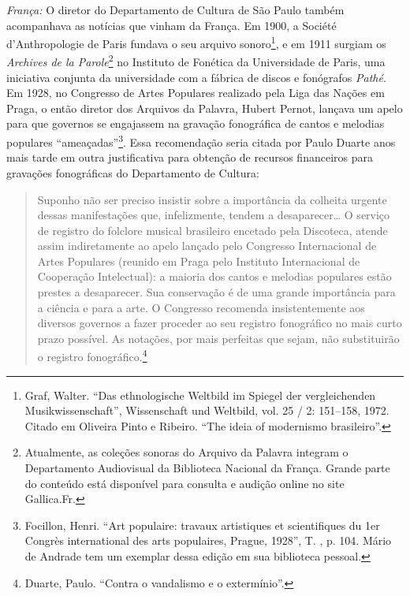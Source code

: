 \emph{França:} O diretor do Departamento de Cultura de São Paulo também
acompanhava as notícias que vinham da França. Em 1900, a Société
d'Anthropologie de Paris fundava o seu arquivo sonoro\footnote{Graf,
  Walter. ``Das ethnologische Weltbild im Spiegel der vergleichenden
  Musikwissenschaft'', Wissenschaft und Weltbild, vol. 25 / 2: 151--158,
  1972. Citado em Oliveira Pinto e Ribeiro. ``The ideia of modernismo
  brasileiro''.}, e em 1911 surgiam os \emph{Archives de la
Parole}\footnote{Atualmente, as coleções sonoras do Arquivo da Palavra
  integram o Departamento Audiovisual da Biblioteca Nacional da França.
  Grande parte do conteúdo está disponível para consulta e audição
  online no site Gallica.Fr.} no Instituto de Fonética da Universidade
de Paris, uma iniciativa conjunta da universidade com a fábrica de
discos e fonógrafos \emph{Pathé}. Em 1928, no Congresso de Artes
Populares realizado pela Liga das Nações em Praga, o então diretor dos
Arquivos da Palavra, Hubert Pernot, lançava um apelo para que governos
se engajassem na gravação fonográfica de cantos e melodias populares
``ameaçadas''\footnote{Focillon, Henri. ``Art populaire: travaux
  artistiques et scientifiques du 1er Congrès international des arts
  populaires, Prague, 1928'', T. , p. 104. Mário de Andrade tem um
  exemplar dessa edição em sua biblioteca pessoal.}. Essa recomendação
seria citada por Paulo Duarte anos mais tarde em outra justificativa
para obtenção de recursos financeiros para gravações fonográficas do
Departamento de Cultura:

\begin{quote}
Suponho não ser preciso insistir sobre a importância da colheita urgente
dessas manifestações que, infelizmente, tendem a desaparecer\ldots{} O
serviço de registro do folclore musical brasileiro encetado pela
Discoteca, atende assim indiretamente ao apelo lançado pelo Congresso
Internacional de Artes Populares (reunido em Praga pelo Instituto
Internacional de Cooperação Intelectual): a maioria dos cantos e
melodias populares estão prestes a desaparecer. Sua conservação é de uma
grande importância para a ciência e para a arte. O Congresso recomenda
insistentemente aos diversos governos a fazer proceder ao seu registro
fonográfico no mais curto prazo possível. As notações, por mais
perfeitas que sejam, não substituirão o registro fonográfico.\footnote{Duarte,
  Paulo. ``Contra o vandalismo e o extermínio''.}
\end{quote}

